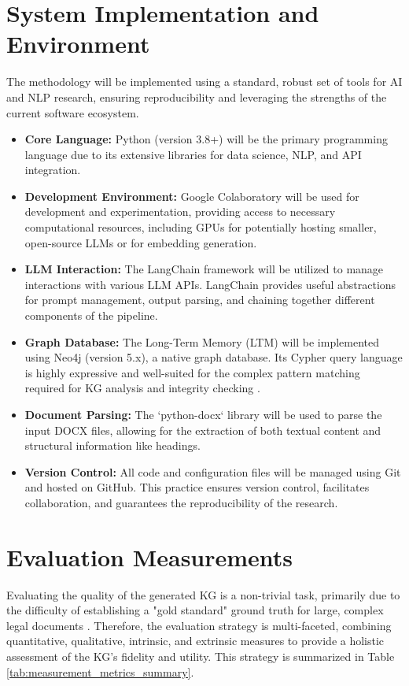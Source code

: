 \section{System Implementation and Environment}
\label{sec:technical_environment}
\label{sec:methodology_env}
The methodology will be implemented using a standard, robust set of tools for AI and NLP research, ensuring reproducibility and leveraging the strengths of the current software ecosystem.
\begin{itemize}
    \item \textbf{Core Language:} Python (version 3.8+) will be the primary programming language due to its extensive libraries for data science, NLP, and API integration.
    \item \textbf{Development Environment:} Google Colaboratory will be used for development and experimentation, providing access to necessary computational resources, including GPUs for potentially hosting smaller, open-source LLMs or for embedding generation.
    \item \textbf{LLM Interaction:} The LangChain framework \parencite{RefWorks:RefID:101-zhao2023survey} will be utilized to manage interactions with various LLM APIs. LangChain provides useful abstractions for prompt management, output parsing, and chaining together different components of the pipeline.
    \item \textbf{Graph Database:} The Long-Term Memory (LTM) will be implemented using Neo4j (version 5.x), a native graph database. Its Cypher query language is highly expressive and well-suited for the complex pattern matching required for KG analysis and integrity checking \parencite{RefWorks:RefID:111-kumar2013querying}.
    \item \textbf{Document Parsing:} The `python-docx` library will be used to parse the input DOCX files, allowing for the extraction of both textual content and structural information like headings.
    \item \textbf{Version Control:} All code and configuration files will be managed using Git and hosted on GitHub. This practice ensures version control, facilitates collaboration, and guarantees the reproducibility of the research.
\end{itemize}

\section{Evaluation Measurements}
Evaluating the quality of the generated KG is a non-trivial task, primarily due to the difficulty of establishing a "gold standard" ground truth for large, complex legal documents \parencite{RefWorks:RefID:76-dhani2021similar}. Therefore, the evaluation strategy is multi-faceted, combining quantitative, qualitative, intrinsic, and extrinsic measures to provide a holistic assessment of the KG's fidelity and utility. This strategy is summarized in Table \cref{tab:measurement_metrics_summary}.


